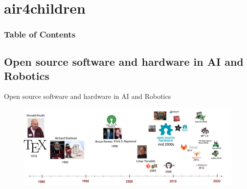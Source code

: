 \section{air4children}


\begin{frame}
      \frametitle{Table of Contents}
      \tableofcontents[currentsection]
\end{frame}


\subsection{Open source software and hardware in AI and Robotics}

{
\begin{frame}{Open source software and hardware in AI and Robotics}

      \begin{figure}
        \centering
        \includegraphics[width=1.0\textwidth]{./figures/timeline-osh/outputs/drawing-v00.png}
      \end{figure}
\end{frame}
}


